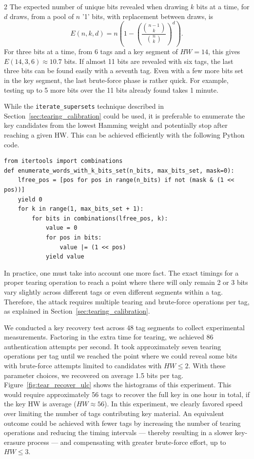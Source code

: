 \documentclass[10pt,letterpaper]{article}
\begin{document}
\begin{multicols}{2}
The expected number of unique bits revealed when drawing $k$ bits at a time, for $d$ draws, from a pool of $n$ '1' bits, with replacement between draws, is
\[
E(n, k, d) = n \left( 1 - \left( \frac{\binom{n-1}{k}}{\binom{n}{k}} \right)^d \right).
\]
For three bits at a time, from 6 tags and a key segment of $HW=14$, this gives $E(14,3,6) \approx 10.7$ bits.
If almost 11 bits are revealed with six tags, the last three bits can be found easily with a seventh tag. Even with a few more bits set in the key segment, the last brute-force phase is rather quick. For example, testing up to 5 more bits over the 11 bits already found takes 1 minute.

While the \texttt{iterate\_supersets} technique described in Section~\ref{sec:tearing_calibration} could be used, it is preferable to enumerate the key candidates from the lowest Hamming weight and potentially stop after reaching a given HW. This can be achieved efficiently with the following Python code.
\begin{lstlisting}[style=custompy]
from itertools import combinations
def enumerate_words_with_k_bits_set(n_bits, max_bits_set, mask=0):
    lfree_pos = [pos for pos in range(n_bits) if not (mask & (1 << pos))]
    yield 0
    for k in range(1, max_bits_set + 1):
        for bits in combinations(lfree_pos, k):
            value = 0
            for pos in bits:
                value |= (1 << pos)
            yield value
\end{lstlisting}
    
In practice, one must take into account one more fact. The exact timings for a proper tearing operation to reach a point where there will only remain 2 or 3 bits vary slightly across different tags or even different segments within a tag. Therefore, the attack requires multiple tearing and brute-force operations per tag, as explained in Section~\ref{sec:tearing_calibration}.

We conducted a key recovery test across 48 tag segments to collect experimental measurements. Factoring in the extra time for tearing, we achieved 86 authentication attempts per second. It took approximately seven tearing operations per tag until we reached the point where we could reveal some bits with brute-force attempts limited to candidates with $HW\leq2$. With these parameter choices, we recovered on average 1.5 bits per tag. Figure~\ref{fig:tear_recover_ulc} shows the histograms of this experiment. This would require approximately 56 tags to recover the full key in one hour in total, if the key HW is average ($HW \approx 56$). 
In this experiment, we clearly favored speed over limiting the number of tags contributing key material. An equivalent outcome could be achieved with fewer tags by increasing the number of tearing operations and reducing the timing intervals --- thereby resulting in a slower key-erasure process --- and compensating with greater brute-force effort, up to $HW\leq3$.


\end{multicols}
\end{document}
